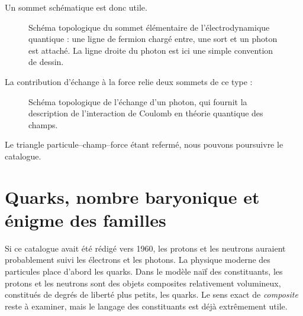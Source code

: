 Un sommet schématique est donc utile.

\begin{figure}[h]
\centering
{}
\caption{Schéma topologique du sommet élémentaire de l’électrodynamique quantique : une ligne de fermion chargé entre, une sort et un photon est attaché. La ligne droite du photon est ici une simple convention de dessin.}
\end{figure}

La contribution d’échange à la force relie deux sommets de ce type :

\begin{figure}[h]
\centering
{}
\caption{Schéma topologique de l’échange d’un photon, qui fournit la description de l’interaction de Coulomb en théorie quantique des champs.}
\end{figure}

Le triangle particule--champ--force étant refermé, nous pouvons poursuivre le catalogue.

\section{Quarks, nombre baryonique et énigme des familles}

Si ce catalogue avait été rédigé vers 1960, les protons et les neutrons auraient probablement suivi les électrons et les photons. La physique moderne des particules place d’abord les quarks. Dans le modèle naïf des constituants, les protons et les neutrons sont des objets composites relativement volumineux, constitués de degrés de liberté plus petits, les quarks. Le sens exact de \emph{composite} reste à examiner, mais le langage des constituants est déjà extrêmement utile.

